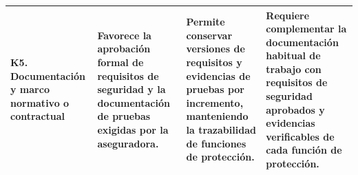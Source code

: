 \begin{longtable}{
|>{\raggedright\arraybackslash}p{}
|>{\raggedright\arraybackslash}p{}
|>{\raggedright\arraybackslash}p{}
|>{\raggedright\arraybackslash}p{}|}
\textbf{K5. Documentación y marco normativo o contractual} &
Favorece la aprobación formal de requisitos de
seguridad y la documentación de pruebas exigidas
por la aseguradora. &
Permite conservar versiones de requisitos y
evidencias de pruebas por incremento, manteniendo
la trazabilidad de funciones de protección. &
Requiere complementar la documentación habitual
de trabajo con requisitos de seguridad aprobados
y evidencias verificables de cada función de
protección. \\
\hline

\end{longtable}

\normalsize
